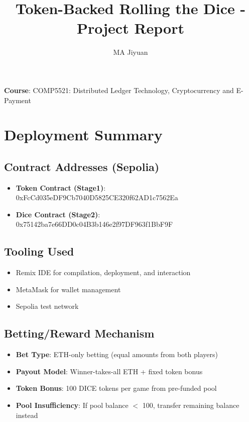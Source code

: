 \documentclass[10pt,a4paper]{article}
\title{\textbf{Token-Backed Rolling the Dice - Project Report}}
\author{MA Jiyuan}
\begin{document}
\maketitle

\noindent\textbf{Course}: COMP5521: Distributed Ledger Technology, Cryptocurrency and E-Payment

\section{Deployment Summary}

\subsection*{Contract Addresses (Sepolia)}
\begin{itemize}
    \item \textbf{Token Contract (Stage1)}: 0xFcCd035eDF9Cb7040D5825CE320f62AD1c7562Ea
    \item \textbf{Dice Contract (Stage2)}: 0x75142ba7e66DD0c04B3b146e2f97DF963f1BbF9F
\end{itemize}

\subsection*{Tooling Used}
\begin{itemize}
    \item Remix IDE for compilation, deployment, and interaction
    \item MetaMask for wallet management
    \item Sepolia test network
\end{itemize}

\subsection*{Betting/Reward Mechanism}
\begin{itemize}
    \item \textbf{Bet Type}: ETH-only betting (equal amounts from both players)
    \item \textbf{Payout Model}: Winner-takes-all ETH + fixed token bonus
    \item \textbf{Token Bonus}: 100 DICE tokens per game from pre-funded pool
    \item \textbf{Pool Insufficiency}: If pool balance $<$ 100, transfer remaining balance instead
\end{itemize}
\end{document}
